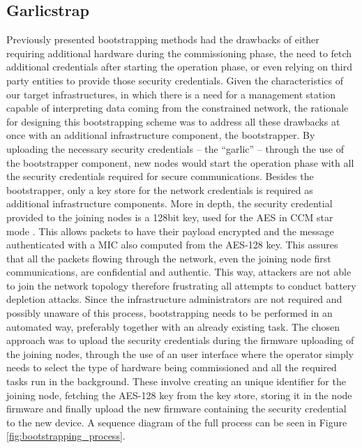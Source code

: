 \documentclass{sig-alternate-05-2015}
\begin{document}
\subsection{Garlicstrap}
\label{sec:implementation_details}
Previously presented bootstrapping methods had the drawbacks of either requiring additional hardware during the commissioning phase, the need to fetch additional credentials after starting the operation phase, or even relying on third party entities to provide those security credentials. Given the characteristics of our target infrastructures, in which there is a need for a management station capable of interpreting data coming from the constrained network, the rationale for designing this bootstrapping scheme was to address all these drawbacks at once with an additional infrastructure component, the bootstrapper. By uploading the necessary security credentials -- the ``garlic'' -- through the use of the bootstrapper component, new nodes would start the operation phase with all the security credentials required for secure communications. Besides the bootstrapper, only a key store for the network credentials is required as additional infrastructure components. More in depth, the security credential provided to the joining nodes is a 128bit key, used for the \gls{AES} \cite{Fips2001} in \gls{CCM} star mode \cite{Corp2005}. This allows packets to have their payload encrypted and the message authenticated with a \gls{MIC} also computed from the AES-128 key. This assures that all the packets flowing through the network, even the joining node first communications, are confidential and authentic. This way, attackers are not able to join the network topology therefore frustrating all attempts to conduct battery depletion attacks. Since the infrastructure administrators are not required and possibly unaware of this process, bootstrapping needs to be performed in an automated way, preferably together with an already existing task. The chosen approach was to upload the security credentials during the firmware uploading of the joining nodes, through the use of an user interface where the operator simply needs to select the type of hardware being commissioned and all the required tasks run in the background. These involve creating an unique identifier for the joining node, fetching the AES-128 key from the key store, storing it in the node firmware and finally upload the new firmware containing the security credential to the new device. A sequence diagram of the full process can be seen in Figure \ref{fig:bootstrapping_process}.
\end{document}
